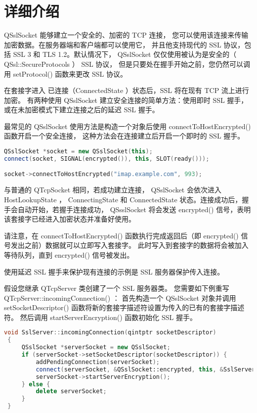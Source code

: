 \section{详细介绍}

QSslSocket 能够建立一个安全的、加密的 TCP 连接，
您可以使用该连接来传输加密数据。在服务器端和客户端都可以使用它，
并且他支持现代的 SSL 协议，包括 SSL 3 和 TLS 1.2。默认情况下，
QSslSocket 仅仅使用被认为是安全的（ QSsl::SecureProtocols ） SSL 协议，
但是只要处在握手开始之前，您仍然可以调用 setProtocol() 函数来更改 SSL 协议。

在套接字进入 已连接（ConnectedState ）状态后，SSL 将在现有 TCP 流上进行加密。
有两种使用 QSslSocket 建立安全连接的简单方法：使用即时 SSL 握手，
或在未加密模式下建立连接之后的延迟 SSL 握手。

最常见的 QSslSocket 使用方法是构造一个对象后使用 connectToHostEncrypted() 
函数开启一个安全连接，
这种方法会在连接建立后开启一个即时的 SSL 握手。

\begin{lstlisting}[language=C++]
QSslSocket *socket = new QSslSocket(this);
connect(socket, SIGNAL(encrypted()), this, SLOT(ready()));

socket->connectToHostEncrypted("imap.example.com", 993);
\end{lstlisting}

与普通的 QTcpSocket 相同，若成功建立连接， QSslSocket 会依次进入 HostLookupState ，
ConnectingState 和 ConnectedState 状态。连接成功后，握手会自动开始，若握手连接成功，
QSsslSocket 将会发送 encrypted() 信号，表明该套接字已经进入加密状态并准备好使用。

请注意，在 connectToHostEncrypted() 函数执行完成返回后（即 encrypted() 信号发出之前）数据就可以立即写入套接字。
此时写入到套接字的数据将会被加入等待队列，直到 encrypted() 信号被发出。

使用延迟 SSL 握手来保护现有连接的示例是 SSL 服务器保护传入连接。

假设您继承 QTcpServer 类创建了一个 SSL 服务器类。
您需要如下例重写 QTcpServer::incomingConnection() ：
首先构造一个 QSslSocket 对象并调用 setSocketDescriptor() 函数将新的套接字描述符设置为传入的已有的套接字描述符。
然后调用 startServerEncryption() 函数初始化 SSL 握手。

\begin{lstlisting}[language=C++]
 void SslServer::incomingConnection(qintptr socketDescriptor)
 {
     QSslSocket *serverSocket = new QSslSocket;
     if (serverSocket->setSocketDescriptor(socketDescriptor)) {
         addPendingConnection(serverSocket);
         connect(serverSocket, &QSslSocket::encrypted, this, &SslServer::ready);
         serverSocket->startServerEncryption();
     } else {
         delete serverSocket;
     }
 }
\end{lstlisting}

